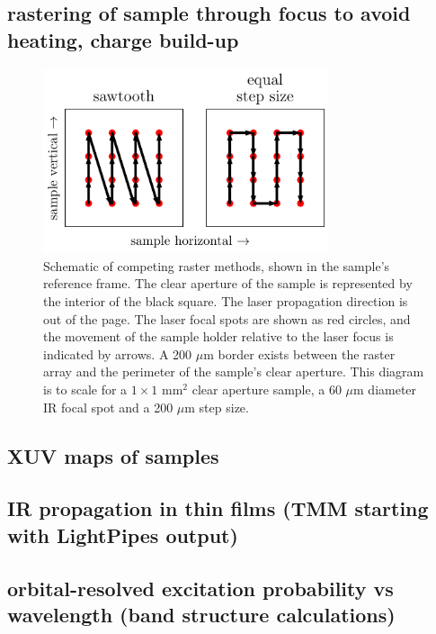 \subsection{rastering of sample through focus to avoid heating, charge build-up}

\begin{figure}
	\centering
	\includegraphics[width=0.75\textwidth]{figures/chap4/rastering_methods.pdf}
	\caption{Schematic of competing raster methods, shown in the sample's reference frame. The clear aperture of the sample is represented by the interior of the black square. The laser propagation direction is out of the page. The laser focal spots are shown as red circles, and the movement of the sample holder relative to the laser focus is indicated by arrows. A 200 $\mu$m border exists between the raster array and the perimeter of the sample's clear aperture. This diagram is to scale for a $1\times1$ mm$^2$ clear aperture sample, a 60 $\mu$m diameter IR focal spot and a 200 $\mu$m step size.}
	\label{fig:Rastering_Methods}
\end{figure}

\subsection{XUV maps of samples}

\subsection{IR propagation in thin films (TMM starting with LightPipes output)}



\subsection{orbital-resolved excitation probability vs wavelength (band structure calculations)}

